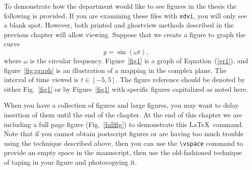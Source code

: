To demonstrate how the department would like to see figures in the
thesis the following is provided. If you are examining these files
with \texttt{xdvi}, you will only see a blank spot. However, both
printed and ghostview methods described in the previous chapter will
allow viewing.  Suppose that we create a figure to graph the curve
\begin{equation}
  y=\sin(\omega t), \label{gr1}
\end{equation}
where $\omega$ is the circular frequency.  Figure~\ref{fig1} is a
graph of Equation~(\ref{gr1}), and figure~\ref{fig:graph} is an
illustration of a mapping in the complex plane. The interval of time
viewed is $t \in [-5,5]$. The figure reference should be denoted by
either Fig.~\ref{fig1} or by Figure~\ref{fig1} with specific figures
capitalized as noted here.



When you have a collection of figures and large figures, you may want
to delay insertion of them until the end of the chapter. At the end of
this chapter we are including a full page figure (Fig.~\ref{fullfig})
to demonstrate this \LaTeX\ command. Note that if you cannot obtain
postscript figures or are having too much trouble using the technique
described above, then you can use the \verb+\vspace+ command to
provide an empty space in the manuscript, then use the old-fashioned
technique of taping in your figure and photocopying it.

